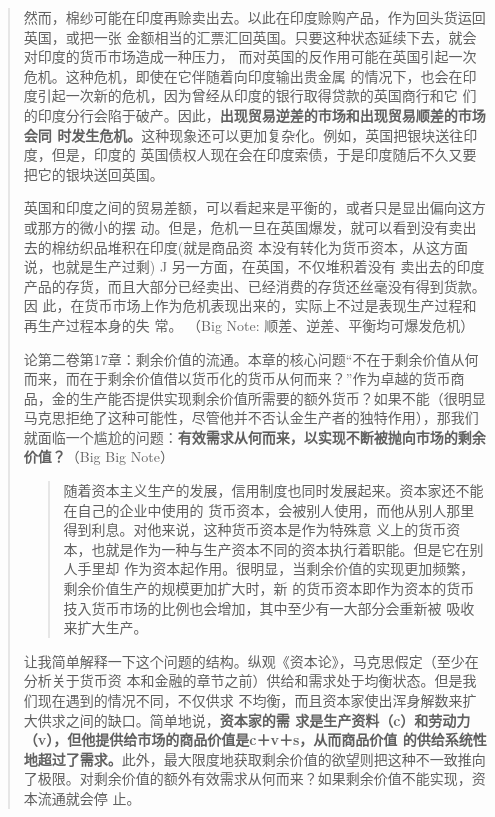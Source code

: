 \begin{quotation}
 然而，棉纱可能在印度再赊卖出去。以此在印度赊购产品，作为回头货运回英国，或把一张
 金额相当的汇票汇回英国。只要这种状态延续下去，就会对印度的货币市场造成一种压力，
 而对英国的反作用可能在英国引起一次危机。这种危机，即使在它伴随着向印度输出贵金属
 的情况下，也会在印度引起一次新的危机，因为曾经从印度的银行取得贷款的英国商行和它
 们的印度分行会陷于破产。因此，\textbf{出现贸易逆差的市场和出现贸易顺差的市场会同
   时发生危机。}这种现象还可以更加复杂化。例如，英国把银块送往印度，但是，印度的
 英国债权人现在会在印度索债，于是印度随后不久又要把它的银块送回英国。

 英国和印度之间的贸易差额，可以看起来是平衡的，或者只是显出偏向这方或那方的微小的摆
 动。但是，危机一旦在英国爆发，就可以看到没有卖出去的棉纺织品堆积在印度(就是商品资
 本没有转化为货币资本，从这方面说，也就是生产过剩) J 另一方面，在英国，不仅堆积着没有
 卖出去的印度产品的存货，而且大部分已经卖出、已经消费的存货还丝毫没有得到货款。因
 此，在货币市场上作为危机表现出来的，实际上不过是表现生产过程和再生产过程本身的失
 常。 （Big Note: 顺差、逆差、平衡均可爆发危机）

论第二卷第17章：剩余价值的流通。本章的核心问题“不在于剩余价值从何而来，而在于剩余价值借以货币化的货币从何而来？”作为卓越的货币商品，金的生产能否提供实现剩余价值所需要的额外货币？如果不能（很明显马克思拒绝了这种可能性，尽管他并不否认金生产者的独特作用），那我们就面临一个尴尬的问题：\textbf{有效需求从何而来，以实现不断被抛向市场的剩余价值？}（Big Big Note）


\begin{quotation}
  随着资本主义生产的发展，信用制度也同时发展起来。资本家还不能在自己的企业中使用的
  货币资本，会被别人使用，而他从别人那里得到利息。对他来说，这种货币资本是作为特殊意
  义上的货币资本，也就是作为一种与生产资本不同的资本执行着职能。但是它在别人手里却
  作为资本起作用。很明显，当剩余价值的实现更加频繁，剩余价值生产的规模更加扩大时，新
  的货币资本即作为资本的货币技入货币市场的比例也会增加，其中至少有一大部分会重新被
  吸收来扩大生产。 

\end{quotation}

让我简单解释一下这个问题的结构。纵观《资本论》，马克思假定（至少在分析关于货币资
本和金融的章节之前）供给和需求处于均衡状态。但是我们现在遇到的情况不同，不仅供求
不均衡，而且资本家使出浑身解数来扩大供求之间的缺口。简单地说，\textbf{资本家的需
  求是生产资料（c）和劳动力（v），但他提供给市场的商品价值是c＋v＋s，从而商品价值
  的供给系统性地超过了需求。}此外，最大限度地获取剩余价值的欲望则把这种不一致推向
了极限。对剩余价值的额外有效需求从何而来？如果剩余价值不能实现，资本流通就会停
止。


\end{quotation}
